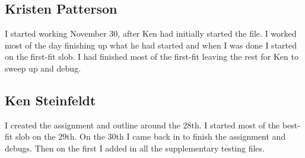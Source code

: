 \documentclass[10pt,letterpaper,onecolumn,draftclsnofoot]{IEEEtran}
\begin{document}
\subsection{Kristen Patterson}
I started working November 30, after Ken had initially started the file.
I worked most of the day finishing up what he had started and when I was done I started on the first-fit slob.
I had finished most of the first-fit leaving the rest for Ken to sweep up and debug.

\subsection{Ken Steinfeldt}
I created the assignment and outline around the 28th.
I started most of the best-fit slob on the 29th.
On the 30th I came back in to finish the assignment and debugs.
Then on the first I added in all the supplementary testing files.
\end{document}
